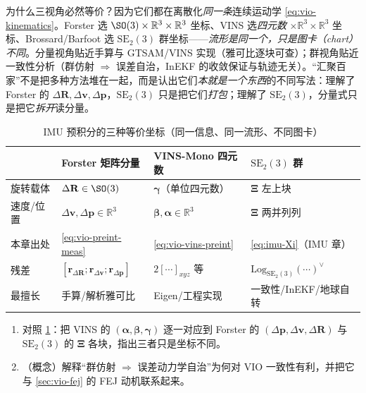 \begin{insight}\label{ins:vio-se23-unify}
为什么三视角必然等价？因为它们都在离散化\emph{同一条}连续运动学 \cref{eq:vio-kinematics}。Forster 选 $\SO(3)\times\mathbb R^3\times\mathbb R^3$ 坐标、VINS 选\emph{四元数} $\times\mathbb R^3\times\mathbb R^3$ 坐标、Brossard/Barfoot 选 $\mathrm{SE}_2(3)$ 群坐标——\emph{流形是同一个，只是图卡（chart）不同}。分量视角贴近手算与 GTSAM/VINS 实现（雅可比逐块可查）；群视角贴近一致性分析（群仿射 $\Rightarrow$ 误差自治，InEKF 的收敛保证与轨迹无关）。“汇聚百家”不是把多种方法堆在一起，而是认出它们\emph{本就是一个东西}的不同写法：理解了 Forster 的 $\Delta\mathbf R,\Delta\mathbf v,\Delta\mathbf p$，$\mathrm{SE}_2(3)$ 只是把它们\emph{打包}；理解了 $\mathrm{SE}_2(3)$，分量式只是把它\emph{拆开}读分量。
\end{insight}

\begin{table}[H]\centering\small
\caption{IMU 预积分的三种等价坐标（同一信息、同一流形、不同图卡）}
\label{tab:vio-three-views}
\begin{tabular}{llll}
\toprule
 & Forster 矩阵分量 & VINS-Mono 四元数 & $\mathrm{SE}_2(3)$ 群 \\
\midrule
旋转载体 & $\Delta\mathbf R\in\SO(3)$ & $\boldsymbol\gamma$（单位四元数）& $\boldsymbol\Xi$ 左上块 \\
速度/位置 & $\Delta\mathbf v,\Delta\mathbf p\in\mathbb R^3$ & $\boldsymbol\beta,\boldsymbol\alpha\in\mathbb R^3$ & $\boldsymbol\Xi$ 两并列列 \\
本章出处 & \cref{eq:vio-preint-meas} & \cref{eq:vio-vins-preint} & \cref{eq:imu-Xi}（IMU 章）\\
残差 & $[\mathbf r_{\Delta\mathbf R};\mathbf r_{\Delta\mathbf v};\mathbf r_{\Delta\mathbf p}]$ & $2[\cdots]_{xyz}$ 等 & $\mathrm{Log}_{\mathrm{SE}_2(3)}(\cdots)^\vee$ \\
最擅长 & 手算/解析雅可比 & Eigen/工程实现 & 一致性/InEKF/地球自转 \\
\bottomrule
\end{tabular}
\end{table}

\begin{practice}
\begin{enumerate}
  \item 对照 \cref{tab:vio-three-views}：把 VINS 的 $(\boldsymbol\alpha,\boldsymbol\beta,\boldsymbol\gamma)$ 逐一对应到 Forster 的 $(\Delta\mathbf p,\Delta\mathbf v,\Delta\mathbf R)$ 与 $\mathrm{SE}_2(3)$ 的 $\boldsymbol\Xi$ 各块，指出三者只是坐标不同。
  \item （概念）解释“群仿射 $\Rightarrow$ 误差动力学自治”为何对 VIO 一致性有利，并把它与 \cref{sec:vio-fej} 的 FEJ 动机联系起来。
\end{enumerate}
\end{practice}

